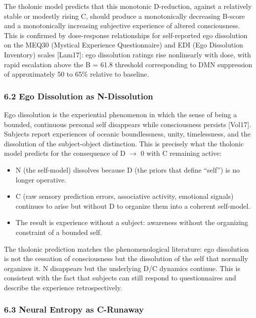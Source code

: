 \documentclass[
  11pt,
  letterpaper,
]{article}
\providecommand{\tightlist}{%
  \setlength{\itemsep}{0pt}\setlength{\parskip}{0pt}}
\begin{document}
The tholonic model predicts that this monotonic D-reduction, against a
relatively stable or modestly rising C, should produce a monotonically
decreasing B-score and a monotonically increasing subjective experience
of altered consciousness. This is confirmed by dose-response
relationships for self-reported ego dissolution on the MEQ30 (Mystical
Experience Questionnaire) and EDI (Ego Dissolution Inventory) scales
{[}Lam17{]}: ego dissolution ratings rise nonlinearly with dose, with
rapid escalation above the B = 61.8 threshold corresponding to DMN
suppression of approximately 50 to 65\% relative to baseline.

\subsubsection{6.2 Ego Dissolution as
N-Dissolution}\label{ego-dissolution-as-n-dissolution}

Ego dissolution is the experiential phenomenon in which the sense of
being a bounded, continuous personal self disappears while consciousness
persists {[}Vol17{]}. Subjects report experiences of oceanic
boundlessness, unity, timelessness, and the dissolution of the
subject-object distinction. This is precisely what the tholonic model
predicts for the consequence of D \(\to\) 0 with C remaining active:

\begin{itemize}
\tightlist
\item
  N (the self-model) dissolves because D (the priors that define
  ``self'') is no longer operative.
\item
  C (raw sensory prediction errors, associative activity, emotional
  signals) continues to arise but without D to organize them into a
  coherent self-model.
\item
  The result is experience without a subject: awareness without the
  organizing constraint of a bounded self.
\end{itemize}

The tholonic prediction matches the phenomenological literature: ego
dissolution is not the cessation of consciousness but the dissolution of
the self that normally organizes it. N disappears but the underlying D/C
dynamics continue. This is consistent with the fact that subjects can
still respond to questionnaires and describe the experience
retrospectively.

\subsubsection{6.3 Neural Entropy as
C-Runaway}\label{neural-entropy-as-c-runaway}
\end{document}
